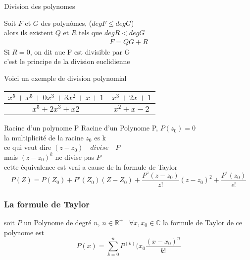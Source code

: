 \begin{definition}{Division des polynomes}
	\begin{theorem}
		Soit $F$ et $G$ des polynômes, ($degF\leq degG$)\\ 
		alors ils existent $Q$ et $R$ tels que $degR<degG$
		\begin{align*}
			F=QG+R
  		\end{align*}
		Si $R=0$, on dit aue F est divisible par G  \\
		c'est le principe de la division euclidienne
		\begin{example}
			Voici un exemple de division polynomial
			\begin{table}
			\begin{tabular}{|c|c|}
				\hline
   				$x^5+x^5+0x^3+3x^2+x+1$ & $x^3+2x+1$ \\ 	
				\hline 
				$x^5+2x^3+x2$ & $x^2+x-2$ \\
				\hline
   			\end{tabular}
			\end{table}
		\end{example}
	\end{theorem}
\end{definition}

\begin{definition}{Racine d'un polynome P}
	Racine d'un Polynome P, $P(z_0)=0$ \\
	la multiplicité de la racine $z_0$ es k \\
	ce qui veut dire $(z-z_0) \quad divise \quad P$ \\
	mais $(z-z_0)^k$ ne divise pas $P$ \\
	cette équivalence est vrai a cause de la formule de Taylor
	\begin{equation*}
		P(Z)=P(Z_0)+P'(Z_0)(Z-Z_0)+\frac{P^z(z-z_0)}{z!}(z-z_0)^2+\frac{P^\epsilon(z_0)}{\epsilon!} 
	\end{equation*}
\end{definition}

\subsubsection{La formule de Taylor}
	soit $P$ un Polynome de degr\'e $n$, $n \in \mathbb{R}^+$ \
	$\forall x, x_0 \in \mathbb{C}$ la formule de Taylor de ce polynome est
	\begin{equation}
		P(x) = \sum_{k=0}^{n} P^{(k)}(x_0 \frac{(x-x_0)^{n}}{k!}
 	\end{equation}
	\begin{definition}
		
	\end{definition}
